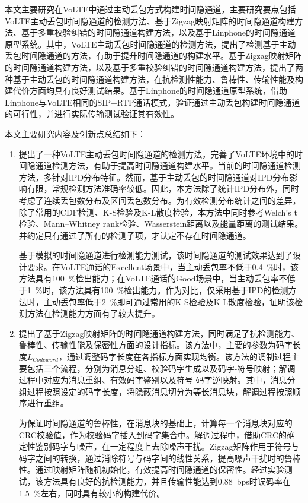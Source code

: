 \begin{conclusion}

本文主要研究在VoLTE中通过主动丢包方式构建时间隐通道，主要研究要点包括VoLTE主动丢包时间隐通道的检测方法、基于Zigzag映射矩阵的时间隐通道构建方法、基于多重校验纠错的时间隐通道构建方法，以及基于Linphone的时间隐通道原型系统。其中，VoLTE主动丢包时间隐通道的检测方法，提出了检测基于主动丢包时间隐通道的方法，有助于提升时间隐通道的构建水平。基于Zigzag映射矩阵的时间隐通道构建方法，以及基于多重校验纠错的时间隐通道构建方法，提出了两种基于主动丢包的时间隐通道构建方法，在抗检测性能力、鲁棒性、传输性能及构建代价方面均具有良好测试结果。基于Linphone的时间隐通道原型系统，借助Linphone与VoLTE相同的SIP+RTP通话模式，验证通过主动丢包构建时间隐通道的可行性，并进行实际传输测试验证其有效性。

本文主要研究内容及创新点总结如下：
\begin{enumerate}
    \item
    提出了一种VoLTE主动丢包时间隐通道的检测方法，完善了VoLTE环境中的时间隐通道检测方法，有助于提高时间隐通道构建水平。当前的时间隐通道检测方法，多针对IPD分布特征。然而，基于主动丢包的时间隐通道对IPD分布影响有限，常规检测方法准确率较低。因此，本方法除了统计IPD分布外，同时考虑了连续丢包数分布及区间丢包数分布。为有效检测分布统计之间的差异，除了常用的CDF检测、K-S检验及K-L散度检验，本方法中同时参考Welch's t检验、Mann–Whitney rank检验、Wasserstein距离以及能量距离的测试结果。并约定只有通过了所有的检测子项，才认定不存在时间隐通道。
    
    基于模拟的时间隐通道进行检测能力测试，该时间隐通道的测试效果达到了设计要求。在VoLTE通话的Excellent场景中，当主动丢包率不低于{0.4\ \%}时，该方法具有{100\ \%}检出能力；在VoLTE通话的Good场景中，当主动丢包率不低于{1\ \%}时，该方法具有{100\ \%}检出能力。作为对比，仅采用基于IPD的检测方法时，主动丢包率低于{2\ \%}即可通过常用的K-S检验及K-L散度检验，证明该检测方法在检测能力方面有了较大提升。
    
    \item
    提出了基于Zigzag映射矩阵的时间隐通道构建方法，同时满足了抗检测能力、鲁棒性、传输性能及保密性方面的设计指标。该方法中，主要的参数为码字长度$L_{Codeword}$，通过调整码字长度在各指标方面实现均衡。该方法的调制过程主要包括三个流程，分别为消息分组、校验码字生成以及码字-符号映射；解调过程中对应为消息重组、有效码字鉴别以及符号-码字逆映射。其中，消息分组过程按照设定的码字长度，将隐蔽消息切分为等长消息块，解调过程按照顺序进行重组。
    
    为保证时间隐通道的鲁棒性，在消息块的基础上，计算每一个消息块对应的CRC校验值，作为校验码字插入到码字集合中。解调过程中，借助CRC的确定性鉴别码字与噪声，在一定程度上去除噪声干扰。Zigzag矩阵作用于符号与码字之间的转换，通过消除符号与码字间的线性关系，提高噪声干扰时的鲁棒性。通过映射矩阵随机初始化，有效提高时间隐通道的保密性。经过实验测试，该方法具有良好的抗检测能力，并且传输性能达到{0.88\ bps}时误码率在{1.5\ \%}左右，同时具有较小的构建代价。
    

\end{enumerate}
\end{conclusion}
